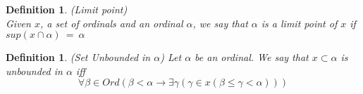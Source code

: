 \documentclass[12pt,a4paper]{article}
\newtheorem{definition}[theorem]{Definition}
\newcommand{\then}{\rightarrow}
\begin{document}
\begin{definition}{(Limit point)}\\
Given $x$, a set of ordinals and an ordinal $\alpha$, we say that $\alpha$ is a \emph{limit point} of $x$ if $sup(x \cap \alpha)\ =\ \alpha$
\end{definition}

\begin{definition}{(Set Unbounded in $\alpha$)}
Let $\alpha$ be an ordinal. We say that $x \subset \alpha$ is \emph{unbounded in $\alpha$} iff
\begin{equation}
\forall \beta \in Ord (\beta < \alpha \then \exists \gamma (\gamma \in x (\beta \leq \gamma < \alpha)))
\end{equation} %
\end{definition}
\end{document}
